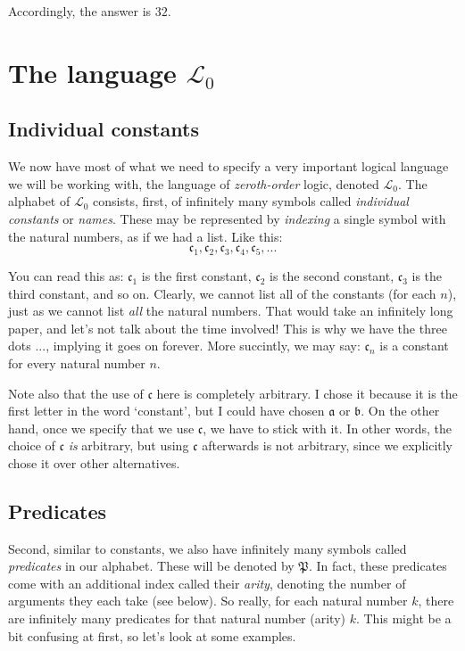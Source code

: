 Accordingly, the answer is $32$. 

\section{The language $\mathcal{L}_0$}

\subsection{Individual constants}

We now have most of what we need to specify a very important logical language we will be working with, the language of \textit{zeroth-order} logic, denoted $\mathcal{L}_0$. The alphabet of $\mathcal{L}_0$ consists, first, of infinitely many symbols called \textit{individual constants} or \textit{names}. These may be represented by \textit{indexing} a single symbol with the natural numbers, as if we had a list. Like this:
\[
\mathfrak{c}_1, \mathfrak{c}_2, \mathfrak{c}_3, \mathfrak{c}_4, \mathfrak{c}_5, ...
\]

You can read this as: $\mathfrak{c}_1$ is the first constant, $\mathfrak{c}_2$ is the second constant, $\mathfrak{c}_3$ is the third constant, and so on. Clearly, we cannot list all of the constants (for each $n$), just as we cannot list \textit{all} the natural numbers. That would take an infinitely long paper, and let's not talk about the time involved! This is why we have the three dots $...$, implying it goes on forever. More succintly, we may say: $\mathfrak{c}_n$ is a constant for every natural number $n$. 

Note also that the use of $\mathfrak{c}$ here is completely arbitrary. I chose it because it is the first letter in the word `constant', but I could have chosen $\mathfrak{a}$ or $\mathfrak{b}$. On the other hand, once we specify that we use $\mathfrak{c}$, we have to stick with it. In other words, the choice of $\mathfrak{c}$ \textit{is} arbitrary, but using $\mathfrak{c}$ afterwards is not arbitrary, since we explicitly chose it over other alternatives. 

\subsection{Predicates}

Second, similar to constants, we also have infinitely many symbols called \textit{predicates} in our alphabet. These will be denoted by $\mathfrak{P}$. In fact, these predicates come with an additional index called their \textit{arity}, denoting the number of arguments they each take (see below). So really, for each natural number $k$, there are infinitely many predicates for that natural number (arity) $k$. This might be a bit confusing at first, so let's look at some examples. 


